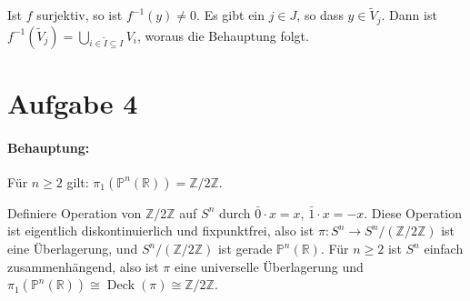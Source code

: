 \documentclass{article}
\begin{document}
Ist $f$ surjektiv, so ist $f^{-1}(y)\ne 0$. Es gibt ein $j\in J$, so dass $y\in \tilde V_j$. Dann ist $f^{-1}(\tilde V_j) = \bigcup_{i\in \tilde I\subseteq I} V_i$, woraus die Behauptung folgt.

\section*{Aufgabe 4}

\paragraph{Behauptung:} Für $n\ge 2$ gilt: $\pi_1(\mathbb P^n(\mathbb R)) = \mathbb Z/2\mathbb Z$.

Definiere Operation von $\mathbb Z/2\mathbb Z$ auf $S^n$ durch $\bar 0 \cdot x = x$, $\bar 1\cdot x = -x$. Diese Operation ist eigentlich diskontinuierlich und fixpunktfrei, also ist $\pi: S^n \to S^n/(\mathbb Z/2\mathbb Z)$ ist eine Überlagerung, und $S^n/(\mathbb Z/2\mathbb Z)$ ist gerade $\mathbb P^n(\mathbb R)$. Für $n\ge 2$ ist $S^n$ einfach zusammenhängend, also ist $\pi$ eine universelle Überlagerung und $\pi_1(\mathbb P^n(\mathbb R)) \cong \operatorname{Deck}(\pi) \cong \mathbb Z/2\mathbb Z$.
\end{document}

